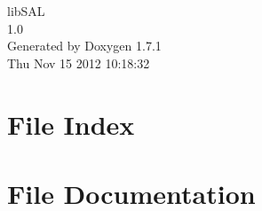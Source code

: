 \documentclass[a4paper]{book}
\begin{document}
\begin{titlepage}
\vspace*{7cm}
\begin{center}
{\Large libSAL \\[1ex]\large 1.0 }\\
\vspace*{1cm}
{\large Generated by Doxygen 1.7.1}\\
\vspace*{0.5cm}
{\small Thu Nov 15 2012 10:18:32}\\
\end{center}
\end{titlepage}
\clearemptydoublepage
{}
\tableofcontents
\clearemptydoublepage
{}
\chapter{File Index}

\chapter{File Documentation}






\printindex
\end{document}

